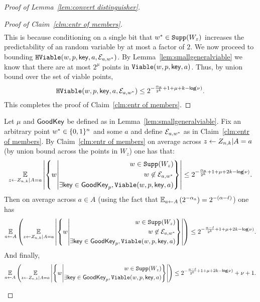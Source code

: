 \begin{proof}[Proof of Lemma~\ref{lem:convert distinguisher}]
\begin{proof}[Proof of Claim~\ref{clm:entr of members}]
\begin{align*}
\end{align*}
This is because conditioning on a single bit that $w^*\in \mathtt{Supp}(W_z)$ increases the predictability of an random variable by at most a factor of $2$. 
We now proceed to bounding $\mathtt{HViable}(w, p, \mathsf{key}, a, \mathcal{E}_{a,w^*})$.  By Lemma~\ref{lem:smallgeneralviable} we know that there are at most $2^\mu$ points in $\mathtt{Viable}(w, p, \mathsf{key}, a)$.  Thus, by union bound over the set of viable points,
\[
\mathtt{HViable}(w, p, \mathsf{key}, a, \mathcal{E}_{a,w^*}) \le 2^{-\frac{\alpha_a}{2^k}+1+\mu+k-\mathsf{log}\!\left(\nu\right)}.
\]
\noindent
This completes the proof of Claim~\ref{clm:entr of members}.
\end{proof}


\begin{corollary}
\label{corollary:info loss}
Let $\mu$ and $\mathsf{GoodKey}$ be defined as in Lemma~\ref{lem:smallgeneralviable}.  Fix an arbitrary point $w^*\in \{0, 1\}^n$ and some $a$ and define $\mathcal{E}_{a,w^*}$ as in Claim~\ref{clm:entr of members}.  By Claim~\ref{clm:entr of members} on average across $z\leftarrow Z_{n,k}| A=a$ (by union bound across the points in $W_z$) one has that:
\begin{align*}
\operatorname*{\mathbb{E}}_{z\leftarrow Z_{n,k}| A=a} \left|\left\{ 
w\middle| \begin{aligned}w\in \mathtt{Supp}(W_z)\\w\not\in \mathcal{E}_{a,w^*} \\\exists \mathsf{key}\in\mathsf{GoodKey}_p, \mathtt{Viable}(w,p,\mathsf{key},a)\end{aligned} \right\} \right| \le 2^{-\frac{\alpha_a}{2^k}+1+\mu+2k-\mathsf{log}\!\left(\nu\right)}.
\end{align*}
Then on average across $a\in A$ (using the fact that $\operatorname*{\mathbb{E}}_{a\leftarrow A} \left(2^{-\alpha_a} \right) = 2^{-(\alpha-\ell)}$) one has 
\begin{align*}
\operatorname*{\mathbb{E}}_{a\leftarrow A}\left(\operatorname*{\mathbb{E}}_{z\leftarrow Z_{n,k}| A=a} \left|\left\{ 
w\middle| \begin{aligned}w\in \mathtt{Supp}(W_z)\\w\not\in \mathcal{E}_{a,w^*} \\\exists \mathsf{key}\in\mathsf{GoodKey}_p, \mathtt{Viable}(w,p,\mathsf{key},a)\end{aligned} \right\} \right| \right)\le 2^{-\frac{\alpha-\ell}{2^k}+1+\mu+2k-\mathsf{log}\!\left(\nu\right)}.
\end{align*}
And finally, 
\begin{align*}
\operatorname*{\mathbb{E}}_{a\leftarrow A}\left(\operatorname*{\mathbb{E}}_{z\leftarrow Z_{n,k}| A=a} \left|\left\{ 
w\middle| \begin{aligned}w\in \mathtt{Supp}(W_z)\\\exists \mathsf{key}\in\mathsf{GoodKey}_p, \mathtt{Viable}(w,p,\mathsf{key},a)\end{aligned} \right\} \right| \right)\le 2^{-\frac{\alpha-\ell}{2^k}+1+\mu+2k-\mathsf{log}\!\left(\nu\right)}+\nu+1.
\end{align*}
\end{corollary}


\end{proof}

